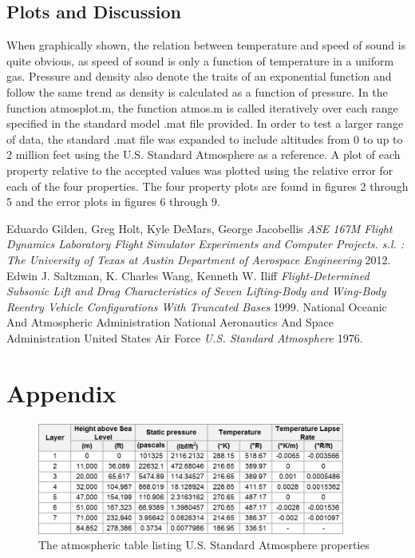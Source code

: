 \documentclass[12pt]{report}
\begin{document}
\subsection{Plots and Discussion}
When graphically shown, the relation between temperature and speed of sound is quite obvious, as speed of sound is only a function of temperature in a uniform gas. Pressure and density also denote the traits of an exponential function and follow the same trend as density is calculated as a function of pressure. In the function atmosplot.m, the function atmos.m is called iteratively over each range specified in the standard model .mat file provided. In order to test a larger range of data, the standard .mat file was expanded to include altitudes from 0 to up to 2 million feet using the U.S. Standard Atmosphere as a reference. A plot of each property relative to the accepted values was plotted using the relative error for each of the four properties. The four property plots are found in figures 2 through 5 and the error plots in figures 6 through 9.


\begin{thebibliography}{0}
 Eduardo Gilden, Greg Holt, Kyle DeMars, George Jacobellis {\em ASE 167M Flight Dynamics Laboratory Flight Simulator Experiments and Computer Projects. s.l. : The University of Texas at Austin Department of Aerospace Engineering}  2012.
 Edwin J. Saltzman, K. Charles Wang, Kenneth W. Iliff {\em Flight-Determined Subsonic Lift and Drag Characteristics of Seven Lifting-Body and Wing-Body Reentry Vehicle Configurations With Truncated Bases} 1999.
 National Oceanic And Atmospheric Administration National Aeronautics And Space Administration United States Air Force {\em U.S. Standard Atmosphere} 1976.
\end{thebibliography}





\section{Appendix}
\begin{figure}[here]
\includegraphics[width=0.9\textwidth]{atmostable.png}
\caption{The atmospheric table listing U.S. Standard Atmosphere properties}
\label{fig:Figure0}
\end{figure}
\end{document}
